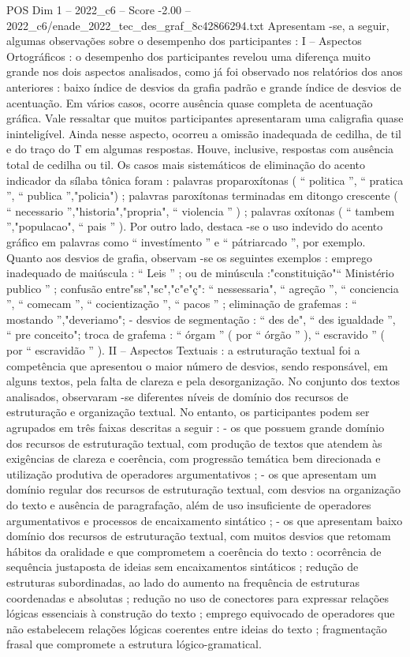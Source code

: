 \begin{textsample}{POS Dim 1 – 2022\_c6 – Score -2.00 – 2022\_c6/enade\_2022\_tec\_des\_graf\_8c42866294.txt}
Apresentam -se, a seguir, algumas observações sobre o desempenho dos participantes : I – Aspectos Ortográficos : o desempenho dos participantes revelou uma diferença muito grande nos dois aspectos analisados, como já foi observado nos relatórios dos anos anteriores : baixo índice de desvios da grafia padrão e grande índice de desvios de acentuação.
Em vários casos, ocorre ausência quase completa de acentuação gráfica.
Vale ressaltar que muitos participantes apresentaram uma caligrafia quase ininteligível.
Ainda nesse aspecto, ocorreu a omissão inadequada de cedilha, de til e do traço do T em algumas respostas.
Houve, inclusive, respostas com ausência total de cedilha ou til.
Os casos mais sistemáticos de eliminação do acento indicador da sílaba tônica foram : palavras proparoxítonas ( “ politica ”, “ pratica ”, “ publica ”,"policia") ; palavras paroxítonas terminadas em ditongo crescente ( “ necessario ”,"historia","propria", “ violencia ” ) ; palavras oxítonas ( “ tambem ”,"populacao", “ pais ” ).
Por outro lado, destaca -se o uso indevido do acento gráfico em palavras como “ investímento ” e “ pátriarcado ”, por exemplo.
Quanto aos desvios de grafia, observam -se os seguintes exemplos : emprego inadequado de maiúscula : “ Leis ” ; ou de minúscula :"constituição"“ Ministério publico ” ; confusão entre"ss","sc","c"e"ç": “ nessessaria", “ agreção ”, “ conciencia ”, “ comecam ”, “ cocientização ”, “ pacos ” ; eliminação de grafemas : “ mostando ”,"deveriamo"; - desvios de segmentação : “ des de", “ des igualdade ”, “ pre conceito"; troca de grafema : “ órgam ” ( por “ órgão ” ), “ escravido ” ( por “ escravidão ” ).
II – Aspectos Textuais : a estruturação textual foi a competência que apresentou o maior número de desvios, sendo responsável, em alguns textos, pela falta de clareza e pela desorganização.
No conjunto dos textos analisados, observaram -se diferentes níveis de domínio dos recursos de estruturação e organização textual.
No entanto, os participantes podem ser agrupados em três faixas descritas a seguir : - os que possuem grande domínio dos recursos de estruturação textual, com produção de textos que atendem às exigências de clareza e coerência, com progressão temática bem direcionada e utilização produtiva de operadores argumentativos ; - os que apresentam um domínio regular dos recursos de estruturação textual, com desvios na organização do texto e ausência de paragrafação, além de uso insuficiente de operadores argumentativos e processos de encaixamento sintático ; - os que apresentam baixo domínio dos recursos de estruturação textual, com muitos desvios que retomam hábitos da oralidade e que comprometem a coerência do texto : ocorrência de sequência justaposta de ideias sem encaixamentos sintáticos ; redução de estruturas subordinadas, ao lado do aumento na frequência de estruturas coordenadas e absolutas ; redução no uso de conectores para expressar relações lógicas essenciais à construção do texto ; emprego equivocado de operadores que não estabelecem relações lógicas coerentes entre ideias do texto ; fragmentação frasal que compromete a estrutura lógico-gramatical.

\end{textsample}
